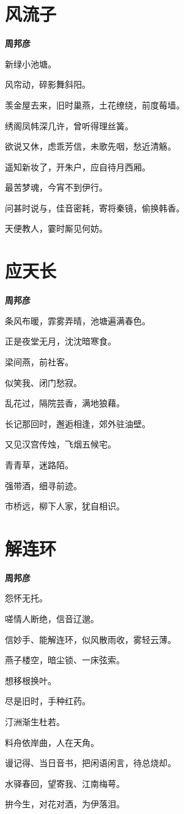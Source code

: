 \documentclass[12pt,a4paper]{ctexbook}
\begin{document}
\section{风流子}
\textbf{周邦彦}\par\vspace{0.5em}
新绿小池塘。\par
风帘动，碎影舞斜阳。\par
羡金屋去来，旧时巢燕，土花缭绕，前度莓墙。\par
绣阁凤帏深几许，曾听得理丝簧。\par
欲说又休，虑乖芳信，未歌先咽，愁近清觞。\par
遥知新妆了，开朱户，应自待月西厢。\par
最苦梦魂，今宵不到伊行。\par
问甚时说与，佳音密耗，寄将秦镜，偷换韩香。\par
天便教人，霎时厮见何妨。\par

\section{应天长}
\textbf{周邦彦}\par\vspace{0.5em}
条风布暖，霏雾弄晴，池塘遍满春色。\par
正是夜堂无月，沈沈暗寒食。\par
梁间燕，前社客。\par
似笑我、闭门愁寂。\par
乱花过，隔院芸香，满地狼藉。\par
长记那回时，邂逅相逢，郊外驻油壁。\par
又见汉宫传烛，飞烟五候宅。\par
青青草，迷路陌。\par
强带酒，细寻前迹。\par
市桥远，柳下人家，犹自相识。\par

\section{解连环}
\textbf{周邦彦}\par\vspace{0.5em}
怨怀无托。\par
嗟情人断绝，信音辽邈。\par
信妙手、能解连环，似风散雨收，雾轻云薄。\par
燕子楼空，暗尘锁、一床弦索。\par
想移根换叶。\par
尽是旧时，手种红药。\par
汀洲渐生杜若。\par
料舟依岸曲，人在天角。\par
谩记得、当日音书，把闲语闲言，待总烧却。\par
水驿春回，望寄我、江南梅萼。\par
拚今生，对花对酒，为伊落泪。\par
\end{document}
